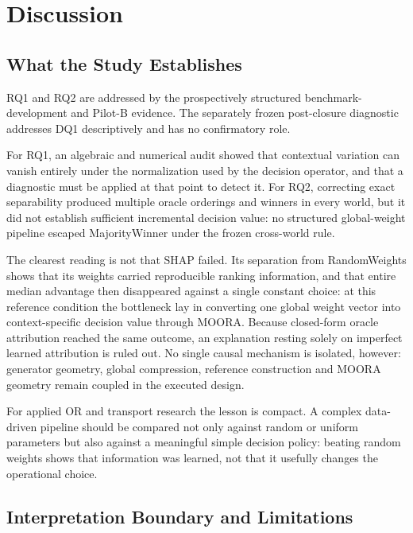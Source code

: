\documentclass[runningheads,orivec]{llncs}
\newcommand{\MOORA}{MOORA}
\begin{document}
\section{Discussion}
\label{sec:discussion}

\subsection{What the Study Establishes}
\label{sec:establishes}

RQ1 and RQ2 are addressed by the prospectively structured benchmark-development and
Pilot-B evidence. The separately frozen post-closure diagnostic addresses DQ1
descriptively and has no confirmatory role.

For RQ1, an algebraic and numerical audit showed that contextual variation can vanish
entirely under the normalization used by the decision operator, and that a diagnostic
must be applied at that point to detect it. For RQ2, correcting exact separability
produced multiple oracle orderings and winners in every world, but it did not establish
sufficient incremental decision value: no structured global-weight pipeline escaped
MajorityWinner under the frozen cross-world rule.

The clearest reading is not that SHAP failed. Its separation from RandomWeights shows
that its weights carried reproducible ranking information, and that entire median
advantage then disappeared against a single constant choice: at this reference
condition the bottleneck lay in converting one global weight vector into
context-specific decision value through \MOORA{}. Because closed-form oracle
attribution reached the same outcome, an explanation resting solely on imperfect
learned attribution is ruled out. No single causal mechanism is isolated, however:
generator geometry, global compression, reference construction and \MOORA{} geometry
remain coupled in the executed design.

For applied OR and transport research the lesson is compact. A complex data-driven
pipeline should be compared not only against random or uniform parameters but also
against a meaningful simple decision policy: beating random weights shows that
information was learned, not that it usefully changes the operational choice.

\subsection{Interpretation Boundary and Limitations}
\label{sec:limits}
\end{document}
